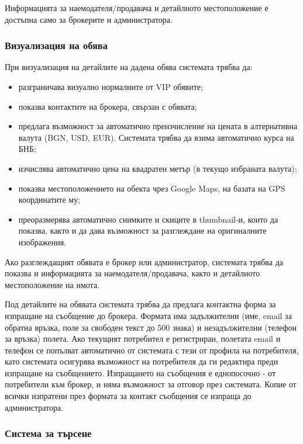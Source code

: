 \documentclass[a4paper]{article}
\begin{document}
Информацията за наемодателя/продавача и детайлното местоположение е достъпна само за брокерите и администратора.

\subsubsection{Визуализация на обява}

При визуализация на детайлите на дадена обява системата трябва да:
	\begin{itemize}
	\item разграничава визуално нормалните от VIP обявите;
	\item показва контактите на брокера, свързан с обявата;
	\item предлага възможност за автоматично преизчисление на цената в алтернативна валута (BGN, USD, EUR).	Системата трябва да взима автоматично курса на БНБ;
	\item изчислява автоматично цена на квадратен метър (в текущо избраната валута);
	\item показва местоположението на обекта чрез Google Maps, на базата на GPS координатите му;
	\item преоразмерява автоматично снимките и скиците в thumbnail-и, които да показва, както и да дава възможност за разглеждане на оригиналните изображения.
	\end{itemize}
				
Ако разглеждащият обявата е брокер или администратор, системата трябва да показва и информацията за наемодателя/продавача, както и детайлното местоположение на имота.
				
Под детайлите на обявата системата трябва да предлага контактна форма за изпращане на съобщение до брокера. Формата има задължителни (име, email за обратна връзка, поле за свободен текст до 500 знака) и незадължителни (телефон за връзка) полета. Ако текущият потребител е регистриран, полетата email и телефон се попълват автоматично от системата с тези от профила на потребителя, като системата осигурява възможност на потребителя да ги редактира преди изпращане на съобщението. Изпращането на съобщения е еднопосочно - от потребители към брокер, и няма възможност за отговор през системата. Копие от всички изпратени през формата за контакт съобщения се изпраща до администратора.

\subsubsection{Система за търсене}
\end{document}
